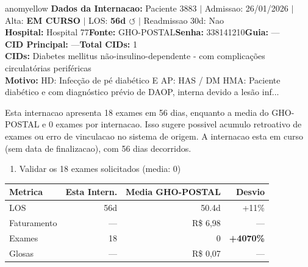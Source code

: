 \documentclass[a4paper,10pt]{article}
\begin{document}
\begin{anomalycard}[Internacao 9898 | GHO-POSTAL | MODERADO (z=2.45)]{anomyellow}
\textbf{Dados da Internacao:} Paciente 3883 $\mid$ Admissao: 26/01/2026 $\mid$ Alta: \textcolor{anomorange}{\textbf{EM CURSO}} $\mid$ LOS: \textbf{56d \textcolor{anomorange}{$\circlearrowleft$}} $\mid$ Readmissao 30d: Nao\\
\textbf{Hospital:} Hospital 77\quad\textbf{Fonte:} GHO-POSTAL\quad\textbf{Senha:} 338141210\quad\textbf{Guia:} ---\\
\textbf{CID Principal:} {\small ---}\quad\textbf{Total CIDs:} 1\\

\textbf{CIDs:} {\scriptsize Diabetes mellitus não-insulino-dependente - com complicações circulatórias periféricas}\\

\textbf{Motivo:} {\scriptsize HD: Infecção de pé diabético E AP: HAS / DM HMA: Paciente diabético e com diagnóstico prévio de DAOP, interna devido a lesão inf...}\\

\vspace{2pt}\begin{tcolorbox}[colback=severityred!20,colframe=anomyellow,title={\textbf{Interpretacao de Negocio}},fonttitle=\bfseries\small,left=4pt,right=4pt,top=3pt,bottom=3pt]
{\small Esta internacao apresenta 18 exames em 56 dias, enquanto a media do GHO-POSTAL e 0 exames por internacao. Isso sugere possivel acumulo retroativo de exames ou erro de vinculacao no sistema de origem. A internacao esta em curso (sem data de finalizacao), com 56 dias decorridos.}
\end{tcolorbox}
\begin{tcolorbox}[colback=severityyellow!30,colframe=anomorange,title={\textbf{Recomendacoes Especificas}},fonttitle=\bfseries\small,left=4pt,right=4pt,top=3pt,bottom=3pt]
\begin{enumerate}[nosep,leftmargin=16pt]
\item {\small Validar os 18 exames solicitados (media: 0)}
\end{enumerate}
\end{tcolorbox}
\begin{center}\begin{tabular}{l r r r}\toprule\textbf{Metrica} & \textbf{Esta Intern.} & \textbf{Media GHO-POSTAL} & \textbf{Desvio} \\\midrule
LOS & 56d & 50.4d & +11\% \\
Faturamento & --- & R\$ 6,98 & --- \\
Exames & 18 & 0 & \textcolor{anomred}{\textbf{+4070\%}} \\
Glosas & --- & R\$ 0,07 & --- \\
\bottomrule\end{tabular}\end{center}


\end{anomalycard}
\end{document}
